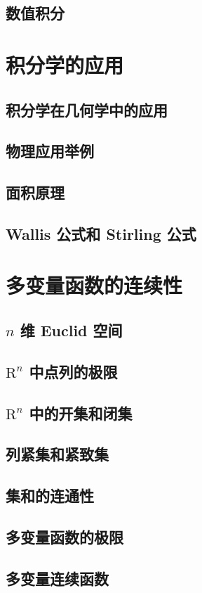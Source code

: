 \documentclass[a4paper, 11pt]{ctexbook}
\begin{document}
        \section{数值积分}
    \chapter{积分学的应用}
        \section{积分学在几何学中的应用}
        \section{物理应用举例}
        \section{面积原理}
        \section{Wallis 公式和 Stirling 公式}
    \chapter{多变量函数的连续性}
        \section{$n$ 维 Euclid 空间}
        \section{$\mathrm{R}^n$ 中点列的极限}
        \section{$\mathrm{R}^n$ 中的开集和闭集}
        \section{列紧集和紧致集}
        \section{集和的连通性}
        \section{多变量函数的极限}
        \section{多变量连续函数}
\end{document}
